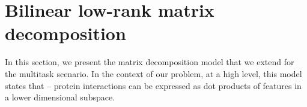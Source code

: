 \documentclass[runningheads,a4paper]{llncs}
\begin{document}



\section{Bilinear low-rank matrix decomposition}
In this section, we present the matrix decomposition model that we extend for the multitask scenario. In the context of our problem, at a high level, this model states that -- protein interactions can be 
expressed as dot products of features in a lower dimensional subspace.
\end{document}
